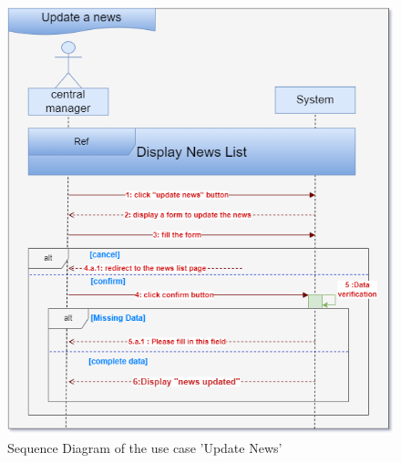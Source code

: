 \begin{figure}[h]
    \centering
    \includegraphics[width=1\textwidth]{figures/seq update a news.png}
    \caption{Sequence Diagram of the use case 'Update News'}
\end{figure}\
\clearpage

